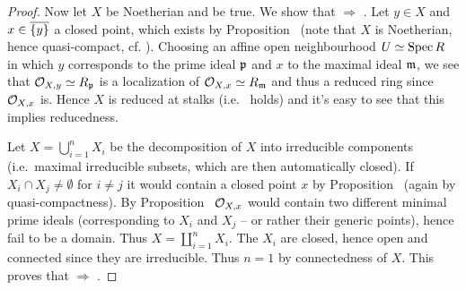 \documentclass[a4paper,parskip=half,numbers=enddot, DIV=12]{scrreprt}
\begin{document}
\begin{proof}
    Now let $X$ be Noetherian and  be true. We show that  $\Rightarrow$ . Let $y\in X$ and $x\in\overline{\{y\}}$ a closed point, which exists by Proposition~ (note that $X$ is Noetherian, hence quasi-compact, cf. \cite[Definition~2.1.2]{alg1}). Choosing an affine open neighbourhood $U\simeq \operatorname{Spec} R$ in which $y$ corresponds to the prime ideal $\mathfrak{p}$ and $x$ to the maximal ideal $\mathfrak{m}$, we see that $\mathcal{O}_{X,y}\simeq R_{\mathfrak{p}}$ is a localization of $\mathcal{O}_{X,x}\simeq R_{\mathfrak{m}}$ and thus a reduced ring since $\mathcal{O}_{X,x}$ is. Hence $X$ is reduced at stalks (i.e.\  holds) and it's easy to see that this implies reducedness.
    
    Let $X=\bigcup_{i=1}^nX_i$ be the decomposition of $X$ into irreducible components (i.e.\ maximal irreducible subsets, which are then automatically closed). If $X_i\cap X_j \neq \emptyset$ for $i\neq j$ it would contain a closed point $x$ by Proposition~ (again by quasi-compactness). By Proposition~ $\mathcal{O}_{X,x}$ would contain two different minimal prime ideals (corresponding to $X_i$ and $X_j$ -- or rather their generic points), hence fail to be a domain. Thus $X=\coprod_{i=1}^nX_i$. The $X_i$ are closed, hence open and connected since they are irreducible. Thus $n=1$ by connectedness of $X$. This proves that  $\Rightarrow$ .
\end{proof}
\end{document}
